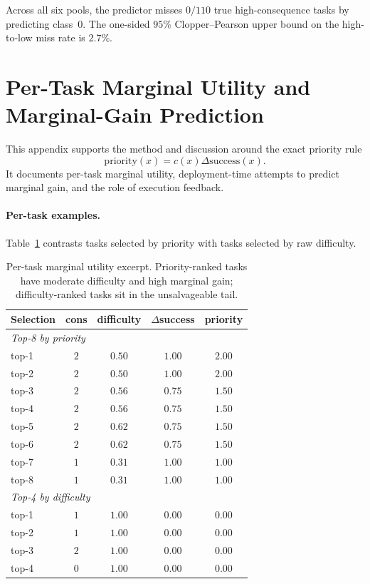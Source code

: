 \documentclass{article}
\begin{document}
Across all six pools, the predictor misses $0/110$ true
high-consequence tasks by predicting class~0. The one-sided
$95\%$ Clopper--Pearson upper bound on the high-to-low miss rate is
$2.7\%$.

\section{Per-Task Marginal Utility and Marginal-Gain Prediction}
\label{app:marginal}

This appendix supports the method and discussion around the exact
priority rule
\[
\mathrm{priority}(x)=c(x)\Delta\mathrm{success}(x).
\]
It documents per-task marginal utility, deployment-time attempts to
predict marginal gain, and the role of execution feedback.

\paragraph{Per-task examples.}
Table~\ref{tab:marg} contrasts tasks selected by priority with tasks
selected by raw difficulty.

\begin{table}[h]
\centering
\caption{Per-task marginal utility excerpt. Priority-ranked tasks have
moderate difficulty and high marginal gain; difficulty-ranked tasks sit
in the unsalvageable tail.}
\label{tab:marg}
\small
\begin{tabular}{lcccc}
\toprule
Selection & cons & difficulty & $\Delta$success & priority \\
\midrule
\multicolumn{5}{l}{\textit{Top-8 by priority}} \\
top-1 & $2$ & $0.50$ & $1.00$ & $2.00$ \\
top-2 & $2$ & $0.50$ & $1.00$ & $2.00$ \\
top-3 & $2$ & $0.56$ & $0.75$ & $1.50$ \\
top-4 & $2$ & $0.56$ & $0.75$ & $1.50$ \\
top-5 & $2$ & $0.62$ & $0.75$ & $1.50$ \\
top-6 & $2$ & $0.62$ & $0.75$ & $1.50$ \\
top-7 & $1$ & $0.31$ & $1.00$ & $1.00$ \\
top-8 & $1$ & $0.31$ & $1.00$ & $1.00$ \\
\midrule
\multicolumn{5}{l}{\textit{Top-4 by difficulty}} \\
top-1 & $1$ & $1.00$ & $0.00$ & $0.00$ \\
top-2 & $1$ & $1.00$ & $0.00$ & $0.00$ \\
top-3 & $2$ & $1.00$ & $0.00$ & $0.00$ \\
top-4 & $0$ & $1.00$ & $0.00$ & $0.00$ \\
\bottomrule
\end{tabular}
\end{table}
\end{document}
